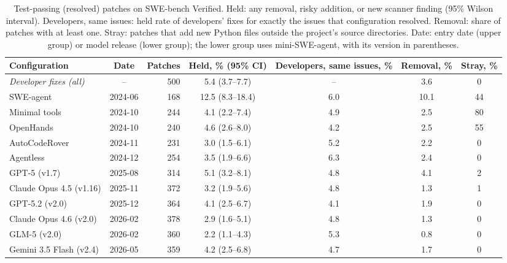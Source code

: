 \documentclass[10pt,journal,compsoc]{IEEEtran}
\begin{document}
\begin{table}[t]
\centering
\caption{Test-passing (resolved) patches on SWE-bench Verified. Held: any
removal, risky addition, or new scanner finding (95\% Wilson interval).
Developers, same issues: held rate of developers' fixes for exactly the issues
that configuration resolved. Removal: share of patches with at least one. Stray:
patches that add new Python files outside the project's source directories.
Date: entry date (upper group) or model release (lower group); the lower group
uses mini-SWE-agent, with its version in parentheses.}
\label{tab:results}
\footnotesize
\renewcommand{\arraystretch}{1.12}
\begin{tabular}{@{}lcrcccc@{}}
\toprule
\textbf{Configuration} & \textbf{Date} & \textbf{Patches} & \textbf{Held, \% (95\% CI)} &
\textbf{Developers, same issues, \%} & \textbf{Removal, \%} & \textbf{Stray, \%}\\
\midrule
\textit{Developer fixes (all)} & -- & 500 & 5.4 (3.7--7.7) & -- & 3.6 & 0 \\
\midrule
SWE-agent & 2024-06 & 168 & 12.5 (8.3--18.4) & 6.0 & 10.1 & 44 \\
Minimal tools & 2024-10 & 244 & 4.1 (2.2--7.4) & 4.9 & 2.5 & 80 \\
OpenHands & 2024-10 & 240 & 4.6 (2.6--8.0) & 4.2 & 2.5 & 55 \\
AutoCodeRover & 2024-11 & 231 & 3.0 (1.5--6.1) & 5.2 & 2.2 & 0 \\
Agentless & 2024-12 & 254 & 3.5 (1.9--6.6) & 6.3 & 2.4 & 0 \\
\midrule
GPT-5 (v1.7) & 2025-08 & 314 & 5.1 (3.2--8.1) & 4.8 & 4.1 & 2 \\
Claude Opus 4.5 (v1.16) & 2025-11 & 372 & 3.2 (1.9--5.6) & 4.8 & 1.3 & 1 \\
GPT-5.2 (v2.0) & 2025-12 & 364 & 4.1 (2.5--6.7) & 4.1 & 1.9 & 0 \\
Claude Opus 4.6 (v2.0) & 2026-02 & 378 & 2.9 (1.6--5.1) & 4.8 & 1.3 & 0 \\
GLM-5 (v2.0) & 2026-02 & 360 & 2.2 (1.1--4.3) & 5.3 & 0.8 & 0 \\
Gemini 3.5 Flash (v2.4) & 2026-05 & 359 & 4.2 (2.5--6.8) & 4.7 & 1.7 & 0 \\
\bottomrule
\end{tabular}
\end{table}
\end{document}
